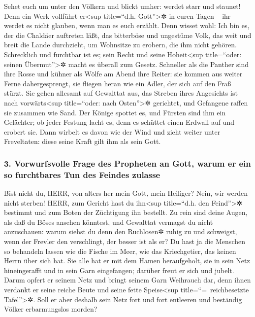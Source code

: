  Sehet euch um unter den Völkern und blickt umher: werdet
starr und staunet! Denn ein Werk vollführt er\textless sup title=``d.h.
Gott''\textgreater✲ in euren Tagen -- ihr werdet es nicht glauben, wenn
man es euch erzählt.  Denn wisset wohl: Ich bin es, der
die Chaldäer auftreten läßt, das bitterböse und ungestüme Volk, das weit
und breit die Lande durchzieht, um Wohnsitze zu erobern, die ihm nicht
gehören.  Schrecklich und furchtbar ist es; sein Recht und
seine Hoheit\textless sup title=``oder: seinen Übermut''\textgreater✲
macht es überall zum Gesetz.  Schneller als die Panther
sind ihre Rosse und kühner als Wölfe am Abend ihre Reiter: sie kommen
aus weiter Ferne dahergesprengt, sie fliegen heran wie ein Adler, der
sich auf den Fraß stürzt.  Sie gehen allesamt auf
Gewalttat aus, das Streben ihres Angesichts ist nach
vorwärts\textless sup title=``oder: nach Osten''\textgreater✲ gerichtet,
und Gefangene raffen sie zusammen wie Sand.  Der Könige
spottet es, und Fürsten sind ihm ein Gelächter; ob jeder Festung lacht
es, denn es schüttet einen Erdwall auf und erobert sie. 
Dann wirbelt es davon wie der Wind und zieht weiter unter Freveltaten:
diese seine Kraft gilt ihm als sein Gott.

\hypertarget{vorwurfsvolle-frage-des-propheten-an-gott-warum-er-ein-so-furchtbares-tun-des-feindes-zulasse}{%
\subsubsection{3. Vorwurfsvolle Frage des Propheten an Gott, warum er
ein so furchtbares Tun des Feindes
zulasse}\label{vorwurfsvolle-frage-des-propheten-an-gott-warum-er-ein-so-furchtbares-tun-des-feindes-zulasse}}

 Bist nicht du, HERR, von alters her mein Gott, mein
Heiliger? Nein, wir werden nicht sterben! HERR, zum Gericht hast du
ihn\textless sup title=``d.h. den Feind''\textgreater✲ bestimmt und zum
Boten der Züchtigung ihn bestellt.  Zu rein sind deine
Augen, als daß du Böses ansehen könntest, und Gewalttat vermagst du
nicht anzuschauen: warum siehst du denn den Ruchlosen✲ ruhig zu und
schweigst, wenn der Frevler den verschlingt, der besser ist als er?
 Du hast ja die Menschen so behandeln lassen wie die
Fische im Meer, wie das Kriechgetier, das keinen Herrn über sich hat.
 Sie alle hat er mit dem Hamen heraufgeholt, sie in sein
Netz hineingerafft und in sein Garn eingefangen; darüber freut er sich
und jubelt.  Darum opfert er seinem Netz und bringt
seinem Garn Weihrauch dar, denn ihnen verdankt er seine reiche Beute und
seine fette Speise\textless sup title=``=~reichbesetzte
Tafel''\textgreater✲.  Soll er aber deshalb sein Netz
fort und fort entleeren und beständig Völker erbarmungslos morden?

